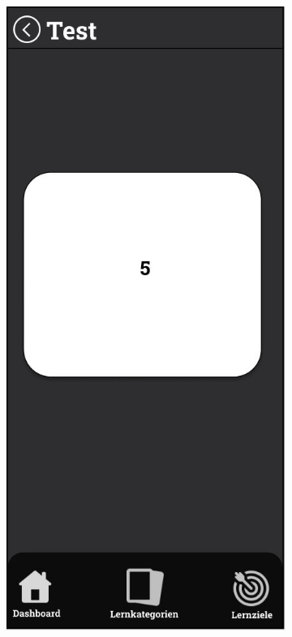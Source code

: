     \newpage

    \begin{figure}[htbp]
        \centering
        \begin{subfigure}[b]{0.45\linewidth}
          \centering
          \includegraphics[width=\linewidth]{images/Mockups/TestAntwort.JPG}

\end{subfigure}
\end{figure}
